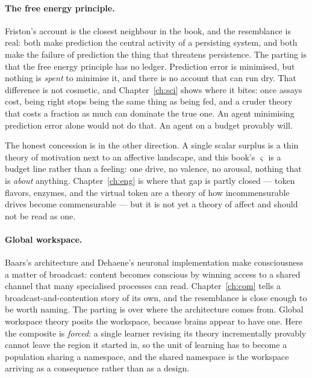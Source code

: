 \paragraph{The free energy principle.}
Friston's account \cite{friston2010free} is the closest neighbour
in the book, and the resemblance is real: both make prediction the
central activity of a persisting system, and both make the failure
of prediction the thing that threatens persistence.
The parting is that the free energy principle has no ledger.
Prediction error is minimised, but nothing is \emph{spent} to
minimise it, and there is no account that can run dry.
That difference is not cosmetic, and Chapter~\ref{ch:sci} shows
where it bites: once assays cost, being right stops being the same
thing as being fed, and a cruder theory that costs a fraction as
much can dominate the true one.
An agent minimising prediction error alone would not do that.
An agent on a budget provably will.

The honest concession is in the other direction.
A single scalar surplus is a thin theory of motivation next to an
affective landscape, and this book's $\varsigma$ is a budget line
rather than a feeling: one drive, no valence, no arousal, nothing
that is \emph{about} anything.
Chapter~\ref{ch:eng} is where that gap is partly closed --- token
flavors, enzymes, and the virtual token are a theory of how
incommensurable drives become commensurable --- but it is not yet
a theory of affect and should not be read as one.

\paragraph{Global workspace.}
Baars's architecture \cite{baars1988} and Dehaene's neuronal
implementation \cite{dehaene2011} make consciousness a matter of
broadcast: content becomes conscious by winning access to a shared
channel that many specialised processes can read.
Chapter~\ref{ch:com} tells a broadcast-and-contention story of its
own, and the resemblance is close enough to be worth naming.
The parting is over where the architecture comes from.
Global workspace theory posits the workspace, because brains appear
to have one.
Here the composite is \emph{forced}: a single learner revising its
theory incrementally provably cannot leave the region it started
in, so the unit of learning has to become a population sharing a
namespace, and the shared namespace is the workspace arriving as a
consequence rather than as a design.

